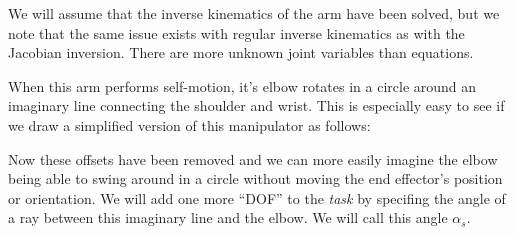 We will assume that the inverse kinematics of the arm have
been solved, but we note that the same issue exists with regular inverse
kinematics as with the Jacobian inversion.  There are more unknown joint
variables than equations.

When this arm performs self-motion, it's elbow rotates in a circle
around an imaginary line connecting the shoulder and wrist.  This is especially 
easy to see if we draw a simplified version of this manipulator as follows:


Now these offsets have been removed and we can more easily imagine the elbow
being able to swing around in a circle without moving the end effector's position
or orientation.
We will add one more ``DOF'' to the {\em task} by specifing the angle of a
ray between this imaginary line and the elbow.  We will call this angle
$\alpha_s$.

